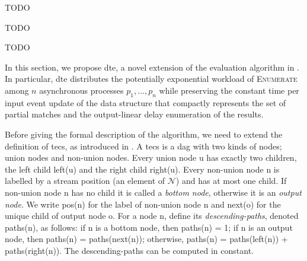 
\begin{lemma}[TODO]
  \label{lemma:todo}
  TODO
\end{lemma}

\begin{theorem}[TODO]
  \label{theorem:todo}
  TODO
\end{theorem}

\begin{example}[TODO]
  \label{example:todo}
  TODO
\end{example}

%
%



In this section, we propose \acrfull{dte}, a novel extension of the evaluation algorithm in \cite{core}. In particular, \acrshort{dte} distributes the potentially exponential workload of \textsc{Enumerate} among $n$ asynchronous processes $p_{1}, \ldots, p_{n}$ while preserving the constant time per input event update of the data structure that compactly represents the set of partial matches and the output-linear delay enumeration of the results.

Before giving the formal description of the algorithm, we need to extend the definition of \acrfull{tecs}, as introduced in \cite{core}. A \acrshort{tecs} is a \acrfull{dag} \tecs with two kinds of nodes; union nodes and non-union nodes. Every union node u has exactly two children, the left child left(u) and the right child right(u). Every non-union node n is labelled by a stream position (an element of $\mathcal{N}$) and has at most one child. If non-union node n has no child it is called a \emph{bottom node}, otherwise it is an \emph{output node}. We write pos(n) for the label of non-union node n and next(o) for the unique child of output node o. For a node n, define its \emph{descending-paths}, denoted paths(n), as follows: if n is a bottom node, then paths(n) = 1; if n is an output node, then paths(n) = paths(next(n)); otherwise, paths(n) = paths(left(n)) + paths(right(n)). The descending-paths can be computed in constant.

